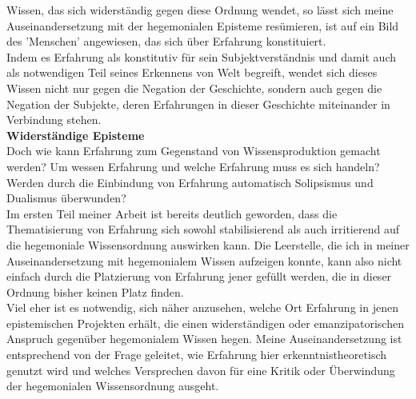 \noindent Wissen, das sich widerständig gegen diese Ordnung wendet, so lässt sich meine
Auseinandersetzung mit der hegemonialen Episteme resümieren, ist auf ein Bild
des 'Menschen' angewiesen, das sich über Erfahrung konstituiert. \\
Indem es
Erfahrung als konstitutiv für sein Subjektverständnis und damit auch als
notwendigen Teil seines Erkennens von Welt begreift, wendet sich dieses Wissen
nicht nur gegen die Negation der Geschichte, sondern auch gegen die Negation der
Subjekte, deren Erfahrungen in dieser Geschichte miteinander in Verbindung
stehen.\\ 

\textbf{\large Widerständige Episteme}\\

\noindent Doch wie kann Erfahrung zum Gegenstand von Wissensproduktion gemacht werden? Um
wessen Erfahrung und welche Erfahrung muss es sich handeln? Werden durch die
Einbindung von Erfahrung automatisch Solipsismus und Dualismus überwunden?\\

\noindent Im
ersten Teil meiner Arbeit ist bereits deutlich geworden, dass die Thematisierung
von Erfahrung sich sowohl stabilisierend als auch irritierend auf die
hegemoniale Wissensordnung auswirken kann. Die Leerstelle, die ich in meiner
Auseinandersetzung mit hegemonialem Wissen aufzeigen konnte, kann also nicht
einfach durch die Platzierung von Erfahrung jener gefüllt werden, die in dieser
Ordnung bisher keinen Platz finden. \\
Viel eher ist es notwendig, sich näher
anzusehen, welche Ort Erfahrung in jenen epistemischen Projekten erhält, die
einen widerständigen oder emanzipatorischen Anspruch gegenüber hegemonialem
Wissen hegen. Meine Auseinandersetzung ist entsprechend von der Frage geleitet,
wie Erfahrung hier erkenntnistheoretisch genutzt wird und welches Versprechen
davon für eine Kritik oder Überwindung der hegemonialen Wissensordnung ausgeht.\\


